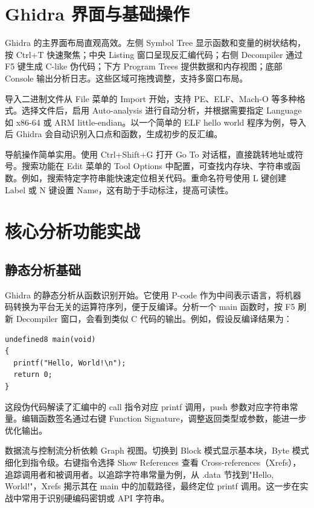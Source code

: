 \chapter{Ghidra 界面与基础操作}
Ghidra 的主界面布局直观高效。左侧 Symbol Tree 显示函数和变量的树状结构，按 Ctrl+T 快速聚焦；中央 Listing 窗口呈现反汇编代码；右侧 Decompiler 通过 F5 键生成 C-like 伪代码；下方 Program Trees 提供数据和内存视图；底部 Console 输出分析日志。这些区域可拖拽调整，支持多窗口布局。\par
导入二进制文件从 File 菜单的 Import 开始，支持 PE、ELF、Mach-O 等多种格式。选择文件后，启用 Auto-analysis 进行自动分析，并根据需要指定 Language 如 x86-64 或 ARM little-endian。以一个简单的 ELF hello world 程序为例，导入后 Ghidra 会自动识别入口点和函数，生成初步的反汇编。\par
导航操作简单实用。使用 Ctrl+Shift+G 打开 Go To 对话框，直接跳转地址或符号。搜索功能在 Edit 菜单的 Tool Options 中配置，可查找内存块、字符串或函数。例如，搜索特定字符串能快速定位相关代码。重命名符号使用 L 键创建 Label 或 N 键设置 Name，这有助于手动标注，提高可读性。\par
\chapter{核心分析功能实战}
\section{静态分析基础}
Ghidra 的静态分析从函数识别开始。它使用 P-code 作为中间表示语言，将机器码转换为平台无关的运算符序列，便于反编译。分析一个 main 函数时，按 F5 刷新 Decompiler 窗口，会看到类似 C 代码的输出。例如，假设反编译结果为：\par
\begin{lstlisting}
undefined8 main(void)
{
  printf("Hello, World!\n");
  return 0;
}
\end{lstlisting}
这段伪代码解读了汇编中的 call 指令对应 printf 调用，push 参数对应字符串常量。编辑函数签名通过右键 Function Signature，调整返回类型或参数，能进一步优化输出。\par
数据流与控制流分析依赖 Graph 视图。切换到 Block 模式显示基本块，Byte 模式细化到指令级。右键指令选择 Show References 查看 Cross-references（Xrefs），追踪调用者和被调用者。以追踪字符串常量为例，从 .data 节找到"Hello, World!"，Xrefs 揭示其在 main 中的加载路径，最终定位 printf 调用。这一步在实战中常用于识别硬编码密钥或 API 字符串。\par
